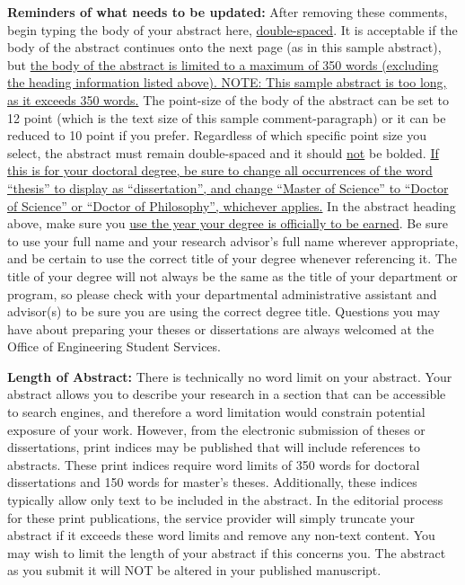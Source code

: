 \begin{thesisabstract}
\textbf{Reminders of what needs to be updated:}
After removing these comments, begin typing the body of your abstract here,
\uline{double-spaced}.  It is acceptable if the body of the abstract continues
onto the next page (as in this sample abstract), but \uline{the body of the
abstract is limited to a maximum of 350 words (excluding the heading
information listed above).  NOTE: This sample abstract is too long, as it
exceeds 350 words.}  The point-size of the body of the abstract can be set to
12 point (which is the text size of this sample comment-paragraph) or it can be
reduced to 10 point if you prefer.  Regardless of which specific point size you
select, the abstract must remain double-spaced and it should \uline{not} be
bolded.  \uline{If this is for your doctoral degree, be sure to change all
occurrences of the word ``thesis'' to display as ``dissertation'', and change
``Master of Science'' to ``Doctor of Science'' or ``Doctor of Philosophy'',
whichever applies.}  In the abstract heading above, make sure you \uline{use
the year your degree is officially to be earned}.  Be sure to use your full
name and your research advisor's full name wherever appropriate, and be certain
to use the correct title of your degree whenever referencing it. The title of
your degree will not always be the same as the title of your department or
program, so please check with your departmental administrative assistant and
advisor(s) to be sure you are using the correct degree title.  Questions you
may have about preparing your theses or dissertations are always welcomed at
the Office of Engineering Student Services.

\textbf{Length of Abstract:}
There is technically no word limit on your abstract.  Your abstract allows you
to describe your research in a section that can be accessible to search
engines, and therefore a word limitation would constrain potential exposure of
your work. However, from the electronic submission of theses or dissertations,
print indices may be published that will include references to abstracts. These
print indices require word limits of 350 words for doctoral dissertations and
150 words for master's theses. Additionally, these indices typically allow only
text to be included in the abstract. In the editorial process for these print
publications, the service provider will simply truncate your abstract if it
exceeds these word limits and remove any non-text content. You may wish to
limit the length of your abstract if this concerns you. The abstract as you
submit it will NOT be altered in your published manuscript.


\end{thesisabstract}
